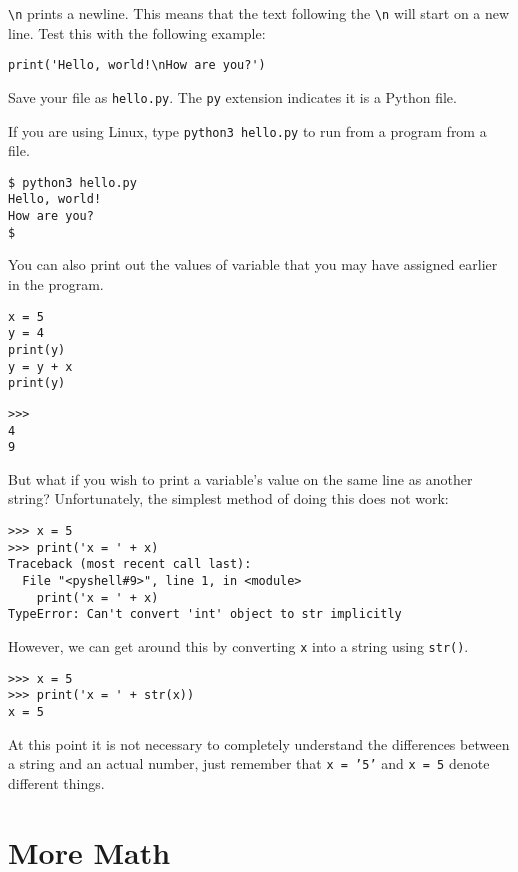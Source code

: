\documentclass[11pt]{cselabheader}
\begin{document}
\texttt{\textbackslash n} prints a newline. This means that the text following
the \texttt{\textbackslash n} will start on a new line. Test this with the
following example:
\begin{lstlisting}[style=python]
print('Hello, world!\nHow are you?')
\end{lstlisting}

Save your file as \texttt{hello.py}. The \texttt{py} extension indicates it is a
Python file.

If you are using Linux, type \texttt{python3 hello.py} to run from a program
from a file.
\begin{lstlisting}[style=bash]
$ python3 hello.py
Hello, world!
How are you?
$
\end{lstlisting}

You can also print out the values of variable that you may have assigned earlier
in the program.
\begin{lstlisting}[style=python]
x = 5
y = 4
print(y)
y = y + x
print(y)
\end{lstlisting}

\begin{lstlisting}[style=bash]
>>> 
4
9
\end{lstlisting}

But what if you wish to print a variable's value on the same line as another
string? Unfortunately, the simplest method of doing this does not work:

\begin{lstlisting}[style=bash]
>>> x = 5
>>> print('x = ' + x)
Traceback (most recent call last):
  File "<pyshell#9>", line 1, in <module>
    print('x = ' + x)
TypeError: Can't convert 'int' object to str implicitly
\end{lstlisting}

However, we can get around this by converting \texttt{x} into a string using
\texttt{str()}.

\begin{lstlisting}[style=bash]
>>> x = 5
>>> print('x = ' + str(x))
x = 5
\end{lstlisting}

At this point it is not necessary to completely understand the differences
between a string and an actual number, just remember that \texttt{x = '5'} and
\texttt{x = 5} denote different things.

\pagebreak

\section{More Math}
\end{document}
